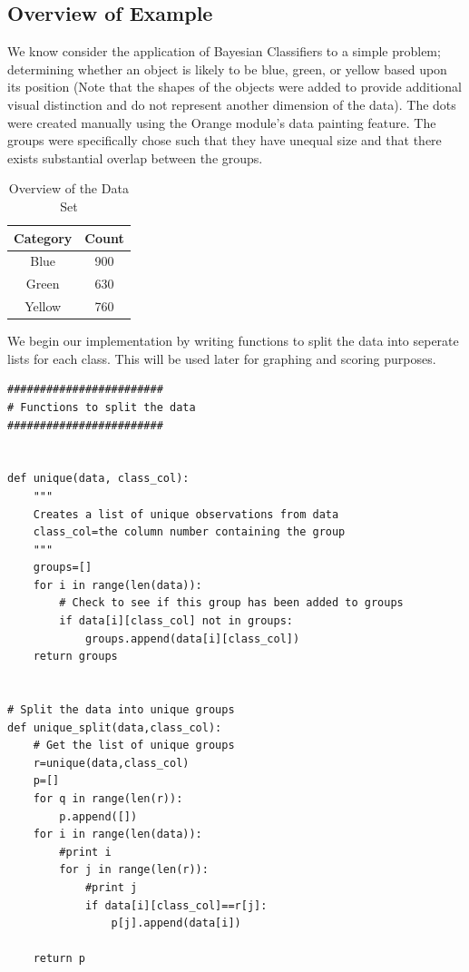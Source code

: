 \subsection{Overview of Example} %
\begin{flushleft}We know consider the application of Bayesian Classifiers to a simple problem; determining whether an object is likely to be blue, green, or yellow based upon its position (Note that the shapes of the objects were added to provide additional visual distinction and do not represent another dimension of the data). The dots were created manually using the Orange module's data painting feature. The groups were specifically chose such that they have unequal size and that there exists substantial overlap between the groups. 
\end{flushleft}

\begin{table}[H]
\caption{Overview of the Data Set}
\centering
\begin{tabular}{c c}
\hline\hline
Category & Count \\
\hline
Blue & 900 \\
Green & 630 \\
Yellow & 760 \\
\hline
\end{tabular}
\label{table:nonlin} 
\end{table}


\begin{flushleft}We begin our implementation by writing functions to split the data into seperate lists for each class. This will be used later for graphing and scoring purposes. 
\end{flushleft}
\begin{lstlisting}[caption={Partition the Data},label=2nd,firstnumber=16]
########################
# Functions to split the data
########################


def unique(data, class_col):
    """
    Creates a list of unique observations from data
    class_col=the column number containing the group
    """
    groups=[]
    for i in range(len(data)):
        # Check to see if this group has been added to groups
        if data[i][class_col] not in groups:
            groups.append(data[i][class_col])
    return groups


# Split the data into unique groups
def unique_split(data,class_col):
    # Get the list of unique groups
    r=unique(data,class_col)
    p=[]
    for q in range(len(r)):
        p.append([])
    for i in range(len(data)):
        #print i
        for j in range(len(r)):
            #print j
            if data[i][class_col]==r[j]:
                p[j].append(data[i])

    return p
\end{lstlisting}

